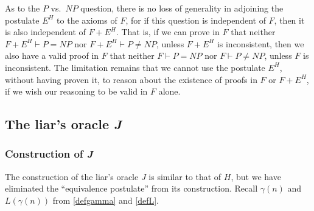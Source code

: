 \documentclass[letterpaper]{article}
\newcommand{\Construction}{{\large\dsmathematical}}
\begin{document}
\begin{remark}
As to the $P$ vs.\ $NP$ question, there is no loss of generality in adjoining the postulate $E^H$ to the axioms of $F$, for if this question is independent of $F$, then it is also independent of $F+E^H$. That is, if we can prove in $F$ that neither  $F+E^H\vdash P=NP$ nor $F+E^H\vdash P\ne NP$, unless $F+E^H$ is inconsistent, then we also have a valid proof in $F$ that neither $F\vdash P=NP$ nor $F\vdash P\ne NP$, unless $F$ is inconsistent.  The limitation remains that we cannot use the postulate $E^H$, without having proven it, to reason about the existence of proofs in $F$ or $F+E^H$, if we wish our reasoning to be valid in $F$ alone.
\end{remark}




\subsection{The liar's oracle \textit{J}}
\subsubsection{Construction of \textit{J}}
The construction of the liar's oracle $J$ is similar to that of $H$, but we have eliminated the ``equivalence postulate'' from its construction.
Recall $\gamma(n)$ and $L(\gamma(n))$ from \Construction\Construction \ref{defgamma} and \ref{defL}.
\end{document}
